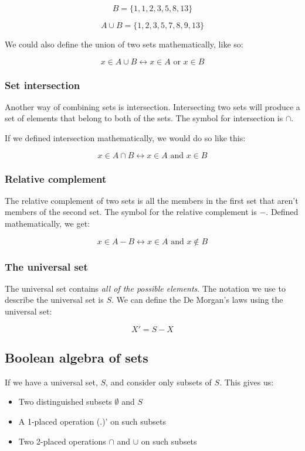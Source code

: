 \documentclass{article}
\begin{document}
\[
 	B = \{1, 1, 2, 3, 5, 8, 13\}
\]

\[
	A \cup B = \{1, 2, 3, 5, 7, 8, 9, 13\}
\]

We could also define the union of two sets mathematically, like so:

\[
	x \in A \cup B \leftrightarrow x \in A \textrm{ or } x \in B
\]

\subsubsection{Set intersection}

Another way of combining sets is intersection. Intersecting two sets will
produce a set of elements that belong to both of the sets. The symbol for
intersection is $\cap$.

If we defined intersection mathematically, we would do so like this:

\[
	x \in A \cap B \leftrightarrow x \in A \textrm{ and } x \in B
\]

\subsubsection{Relative complement}

The relative complement of two sets is all the members in the first set that
aren't members of the second set. The symbol for the relative complement is $-$.
Defined mathematically, we get:

\[
	x \in A - B \leftrightarrow x \in A \textrm{ and } x \not\in B
\]

\subsubsection{The universal set}

The universal set contains {\it all of the possible elements}. The notation we use to describe the universal set is $S$. We can define the De Morgan's laws using the universal set:

\[
	X' = S - X
\]

\subsection{Boolean algebra of sets}

If we have a universal set, $S$, and consider only subsets of $S$. This gives us:

\begin{itemize}
	\item Two distinguished subsets $\emptyset$ and $S$
	\item A 1-placed operation (.)' on such subsets
	\item Two 2-placed operations $\cap$ and $\cup$ on such subsets
\end{itemize}
\end{document}

